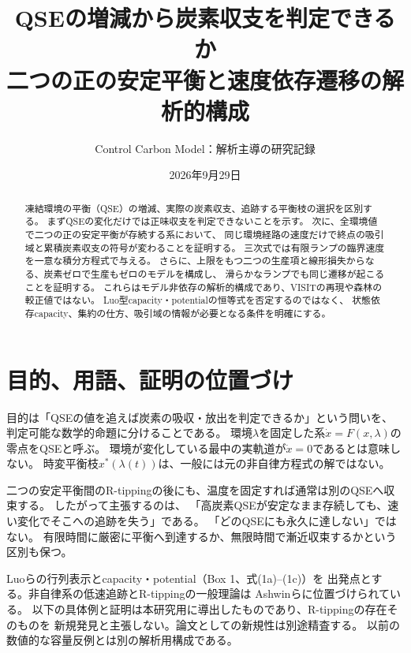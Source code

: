 \documentclass[a4paper,11pt]{ltjsarticle}
\title{QSEの増減から炭素収支を判定できるか\\
\large 二つの正の安定平衡と速度依存遷移の解析的構成}
\author{Control Carbon Model：解析主導の研究記録}
\date{2026年9月29日}
\begin{document}
\maketitle
\begin{abstract}
凍結環境の平衡（QSE）の増減、実際の炭素収支、追跡する平衡枝の選択を区別する。
まずQSEの変化だけでは正味収支を判定できないことを示す。
次に、全環境値で二つの正の安定平衡が存続する系において、
同じ環境経路の速度だけで終点の吸引域と累積炭素収支の符号が変わることを証明する。
三次式では有限ランプの臨界速度を一意な積分方程式で与える。
さらに、上限をもつ二つの生産項と線形損失からなる、炭素ゼロで生産もゼロのモデルを構成し、
滑らかなランプでも同じ遷移が起こることを証明する。
これらはモデル非依存の解析的構成であり、VISITの再現や森林の較正値ではない。
Luo型capacity・potentialの恒等式を否定するのではなく、
状態依存capacity、集約の仕方、吸引域の情報が必要となる条件を明確にする。
\end{abstract}
\tableofcontents

\section{目的、用語、証明の位置づけ}
目的は「QSEの値を追えば炭素の吸収・放出を判定できるか」という問いを、
判定可能な数学的命題に分けることである。
環境$\lambda$を固定した系$\dot x=F(x,\lambda)$の零点をQSEと呼ぶ。
環境が変化している最中の実軌道が$\dot x=0$であるとは意味しない。
時変平衡枝$x^*(\lambda(t))$は、一般には元の非自律方程式の解ではない。

二つの安定平衡間のR-tippingの後にも、温度を固定すれば通常は別のQSEへ収束する。
したがって主張するのは、
「高炭素QSEが安定なまま存続しても、速い変化でそこへの追跡を失う」である。
「どのQSEにも永久に達しない」ではない。
有限時間に厳密に平衡へ到達するか、無限時間で漸近収束するかという区別も保つ。

Luoら\cite{luo}の行列表示とcapacity・potential（Box 1、式(1a)--(1c)）を
出発点とする。非自律系の低速追跡とR-tippingの一般理論は
Ashwinら\cite{ashwin}に位置づけられている。
以下の具体例と証明は本研究用に導出したものであり、R-tippingの存在そのものを
新規発見と主張しない。論文としての新規性は別途精査する。
以前の数値的な容量反例とは別の解析用構成である。
\end{document}
